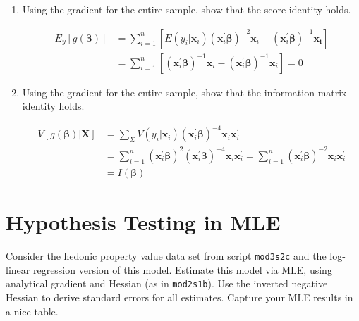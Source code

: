 \documentclass[11pt,reqno]{amsart}\usepackage[]{graphicx}\usepackage[]{color}
\begin{document}
\begin{enumerate}
\item Using the gradient for the entire sample, show that the score identity holds.

\begin{equation*}
\begin{split}
E_{y}[g(\boldsymbol{\beta})]&=\sum_{i=1}^{n}\left[E\left(y_{i} | \mathbf{x}_{i}\right)\left(\mathbf{x}_{i}^{\prime} \boldsymbol{\beta}\right)^{-2} \mathbf{x}_{i}-\left(\mathbf{x}_{i}^{\prime} \boldsymbol{\beta}\right)^{-1} \mathbf{x}_{\mathbf{i}}\right] \\
&= \sum_{i=1}^{n}\left[\left(\mathbf{x}_{i}^{\prime} \boldsymbol{\beta}\right)^{-1} \mathbf{x}_{i}-\left(\mathbf{x}_{i}^{\prime} \boldsymbol{\beta}\right)^{-1} \mathbf{x}_{i}\right]=0
\end{split}
\end{equation*}

\item Using the gradient for the entire sample, show that the information matrix identity holds.

\begin{equation*}
\begin{split}
V[g(\boldsymbol{\beta}) | \mathbf{X}]&=\sum_{\Sigma} V\left(y_{i} | \mathbf{x}_{i}\right)\left(\mathbf{x}_{i}^{\prime} \boldsymbol{\beta}\right)^{-4} \mathbf{x}_{i} \mathbf{x}_{i}^{\prime}\\
&=\sum_{i=1}^{n}\left(\mathbf{x}_{i}^{\prime} \boldsymbol{\beta}\right)^{2}\left(\mathbf{x}_{i}^{\prime} \boldsymbol{\beta}\right)^{-4} \mathbf{x}_{i} \mathbf{x}_{i}^{\prime} = \sum_{i=1}^{n}\left(\mathbf{x}_{i}^{\prime} \boldsymbol{\beta}\right)^{-2} \mathbf{x}_{i} \mathbf{x}_{i}^{\prime}\\& = I(\boldsymbol{\beta})
\end{split}
\end{equation*}
\end{enumerate}

\section{Hypothesis Testing in MLE}
Consider the hedonic property value data set from script \texttt{mod3s2c} and 
the log-linear regression version of this model.  Estimate this model via MLE,  
using analytical gradient and Hessian (as in \texttt{mod2s1b}). 
Use the inverted negative Hessian to derive standard errors for all estimates. 
Capture your MLE results in a nice table.\\
\end{document}
